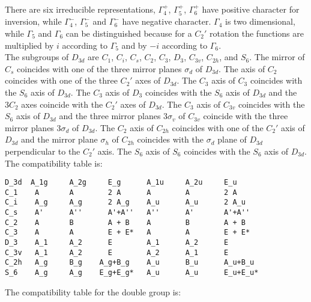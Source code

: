 \documentclass[12pt,a4paper,twoside]{report}
\begin{document}
There are six irreducible representations, $\Gamma_4^+$, $\Gamma_5^+$,
$\Gamma_6^+$ have positive character for inversion, while $\Gamma_4^-$, 
$\Gamma_5^-$ and $\Gamma_6^-$ have negative character. $\Gamma_4$ is two 
dimensional, while $\Gamma_5$ and $\Gamma_6$ can be distinguished because 
for a $C_2'$ rotation the functions are multiplied by $i$ according to 
$\Gamma_5$ and by $-i$ according to $\Gamma_6$. \\
The subgroups of $D_{3d}$ are $C_1$, $C_i$, $C_s$, $C_2$, $C_3$, $D_3$, 
$C_{3v}$, $C_{2h}$, and $S_6$. The mirror of $C_s$ coincides with one
of the three mirror planes $\sigma_d$ of $D_{3d}$. The axis of $C_2$
coincides with one of the three $C_2'$ axes of $D_{3d}$. 
The $C_3$ axis of $C_3$ coincides with the $S_6$ axis of $D_{3d}$.
The $C_3$ axis of $D_3$ coincides with the $S_6$ axis of $D_{3d}$ and the
$3C_2$ axes coincide with the $C_2'$ axes of $D_{3d}$. The $C_3$ axis
of $C_{3v}$ coincides with the $S_6$ axis of $D_{3d}$ and the three
mirror planes $3\sigma_v$ of $C_{3v}$ coincide with the three mirror
planes $3\sigma_d$ of $D_{3d}$. The $C_2$ axis of 
$C_{2h}$ coincides with one of the $C_2'$ axis of $D_{3d}$ and the mirror
plane $\sigma_h$ of $C_{2h}$ coincides with the $\sigma_d$ plane of $D_{3d}$
perpendicular to the $C_2'$ axis. The $S_6$ axis of $S_6$ coincides with the
$S_6$ axis of $D_{3d}$. \\
The compatibility table is:

\begin{tcolorbox}
\begin{footnotesize}
\begin{verbatim}
D_3d  A_1g     A_2g     E_g      A_1u     A_2u     E_u
C_1    A       A        2 A      A        A        2 A
C_i    A_g     A_g      2 A_g    A_u      A_u      2 A_u
C_s    A'      A''      A'+A''   A''      A'       A'+A''
C_2    A       B        A + B    A        B        A + B
C_3    A       A        E + E*   A        A        E + E*
D_3    A_1     A_2      E        A_1      A_2      E
C_3v   A_1     A_2      E        A_2      A_1      E
C_2h   A_g     B_g    A_g+B_g    A_u      B_u      A_u+B_u   
S_6    A_g     A_g    E_g+E_g*   A_u      A_u      E_u+E_u*
\end{verbatim}
\end{footnotesize}
\end{tcolorbox}

The compatibility table for the double group is:
\end{document}
